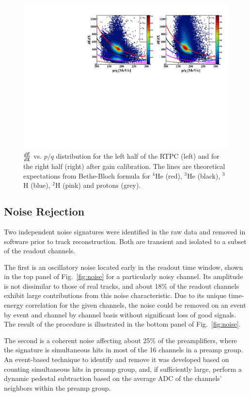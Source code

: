 \documentclass[preprint,5p]{elsarticle}
\begin{document}
\begin{figure}[tb]
\centering
\includegraphics[scale=0.73]{fig_2017/f_dedx_p_exp_2nd.pdf}
\caption{$\small{\frac{dE}{dX}}$ vs. $p/q$ distribution for the left half of 
   the RTPC (left) and for the right half (right) after gain calibration.  
   The lines are theoretical expectations from Bethe-Bloch formula for $^4$He 
   (red), $^3$He (black), $^3$H (blue), $^2$H (pink) and protons (grey).}
\label{fig:dedx_p_exp_2nd}
\end{figure}

\subsection{Noise Rejection}
Two independent noise signatures were identified in the raw data and removed 
in software prior to track reconstruction. Both are transient and isolated to 
a subset of the readout channels. 

The first is an oscillatory noise located early in the readout time window, 
shown in the top panel of Fig.~\ref{fig:noise} for a particularly noisy 
channel. Its amplitude is not dissimilar to those of real tracks, and about 
18\% of the readout channels exhibit large contributions from this noise 
characteristic. Due to its unique time-energy correlation for the given 
channels, the noise could be removed on an event by event and channel by 
channel basis without significant loss of good signals. The result of the
procedure is illustrated in the bottom panel of Fig.~\ref{fig:noise}.

The second is a coherent noise affecting about 25\% of the preamplifiers, where 
the signature is simultaneous hits in most of the 16 channels in a preamp 
group.   An event-based technique to identify and remove it was developed based 
on counting simultaneous hits in preamp group, and, if sufficiently large, 
perform a dynamic pedestal subtraction based on the average ADC of the 
channels' neighbors within the preamp group.
\end{document}
